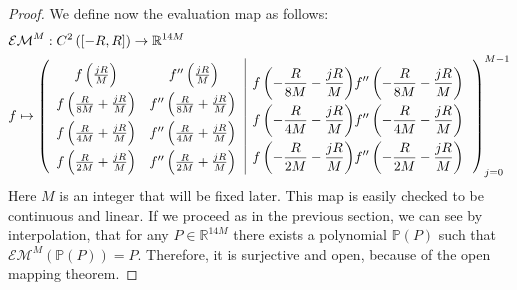 \documentclass{amsart}
\theoremstyle{definition}
\theoremstyle{remark}
\numberwithin{equation}{section}
\theoremstyle{definition}
\theoremstyle{remark}
\begin{document}
\begin{proof}
	 We define now the evaluation map as follows: 
	\begin{equation}
		\begin{aligned}
			&\mathcal{EM}^M:C^2\left(\left[-R,R\right]\right)\rightarrow\mathbb{R}^{14M}\\&f\mapsto \left(\begin{array}{c c | c }
				f\left(\frac{jR}{M}\right) & f''\left(\frac{jR}{M}\right) &\multirow{4}{*}{$\begin{aligned} f\left(-\frac{R}{8M}-\frac{jR}{M}\right)&   f''\left(-\frac{R}{8M}-\frac{jR}{M}\right)\\
        f\left(-\frac{R}{4M}-\frac{jR}{M}\right)&  f''\left(-\frac{R}{4M}-\frac{jR}{M}\right)\rule{0pt}{18pt}\\  f\left(-\frac{R}{2M}-\frac{jR}{M}\right)&  f''\left(-\frac{R}{2M}-\frac{jR}{M}\right)\rule{0pt}{18pt}\end{aligned}$}\rule{0pt}{15pt} \\ f\left(\frac{R}{8M}+\frac{jR}{M}\right)&  f''\left(\frac{R}{8M}+\frac{jR}{M}\right) \rule{0pt}{15pt}\\f\left(\frac{R}{4M}+\frac{jR}{M}\right)&  f''\left(\frac{R}{4M}+\frac{jR}{M}\right)\rule{0pt}{15pt}\\f\left(\frac{R}{2M}+\frac{jR}{M}\right)&  f''\left(\frac{R}{2M}+\frac{jR}{M}\right)\rule{0pt}{15pt}
			\end{array}\right)_{j=0}^{M-1}
		\end{aligned}
       \end{equation} Here $M$ is an integer that will be fixed later. This map is easily checked to be continuous and linear.	If we proceed as in the previous section, we can see by interpolation, that for any $P\in \mathbb{R}^{14M}$ there exists a polynomial $\mathbb{P}(P)$ such that $\mathcal{EM}^M\left(\mathbb{P}(P)\right)=P$. Therefore, it is surjective and open, because of the open mapping theorem.
	

\end{proof}
\end{document}

